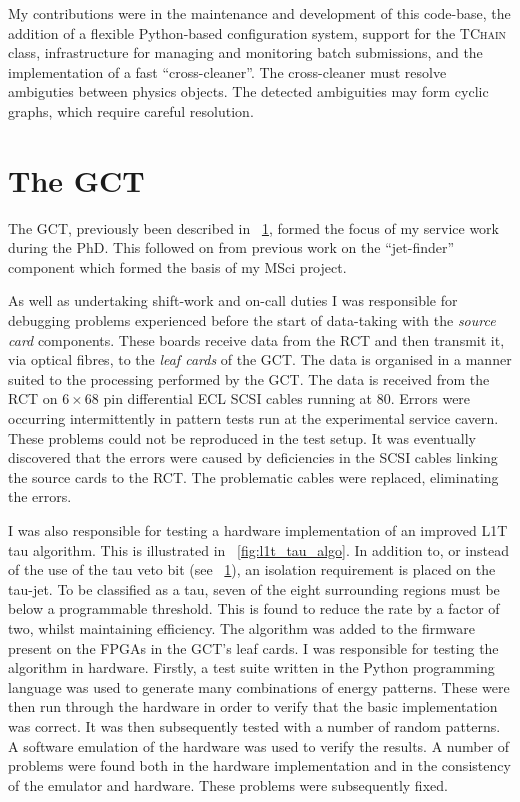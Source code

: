 My contributions were in the maintenance and development of this code-base, the
addition of a flexible Python-based configuration system, support for the \root
\textsc{TChain} class, infrastructure for managing and monitoring batch
submissions, and the implementation of a fast ``cross-cleaner''. The
cross-cleaner must resolve ambiguties between physics objects. The detected
ambiguities may form cyclic graphs, which require careful resolution.

\section{The \acl{GCT}}
\label{sec:l1t}
The \ac{GCT}, previously been described in \sec~\ref{sec:l1t}, formed the focus
of my service work during the PhD. This followed on from previous work on the
``jet-finder'' component which formed the basis of my MSci project.

As well as undertaking shift-work and on-call duties I was responsible for
debugging problems experienced before the start of data-taking with the
\emph{source card} components. These boards receive data from the \ac{RCT} and
then transmit it, via optical fibres, to the \emph{leaf cards} of the
\ac{GCT}. The data is organised in a manner suited to the processing performed
by the \ac{GCT}. The data is received from the \ac{RCT} on $6\times 68$ pin
differential \ac{ECL} \ac{SCSI} cables running at \unit{80}{\mega\hertz}. Errors
were occurring intermittently in pattern tests run at the experimental service
cavern. These problems could not be reproduced in the test setup. It was
eventually discovered that the errors were caused by deficiencies in the
\ac{SCSI} cables linking the source cards to the \ac{RCT}. The problematic
cables were replaced, eliminating the errors.

I was also responsible for testing a hardware implementation of an improved
\ac{L1T} tau algorithm. This is illustrated in \fig~\ref{fig:l1t_tau_algo}. In
addition to, or instead of the use of the tau veto bit (see \sec~\ref{sec:l1t}),
an isolation requirement is placed on the tau-jet. To be classified as a tau,
seven of the eight surrounding regions must be below a programmable
threshold. This is found to reduce the rate by a factor of two, whilst
maintaining efficiency. The algorithm was added to the firmware present on the
\acp{FPGA} in the \ac{GCT}'s leaf cards. I was responsible for testing the
algorithm in hardware. Firstly, a test suite written in the Python programming
language was used to generate many combinations of energy patterns. These were
then run through the hardware in order to verify that the basic implementation
was correct. It was then subsequently tested with a number of random patterns. A
software emulation of the hardware was used to verify the results. A number of
problems were found both in the hardware implementation and in the consistency
of the emulator and hardware. These problems were subsequently fixed.


